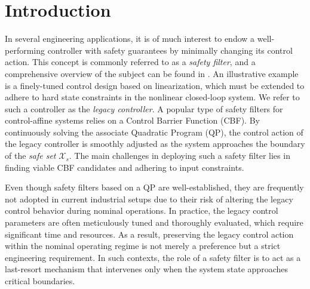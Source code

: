 \documentclass[lettersize,journal]{IEEEtran}
\newcommand{\afterReviewChangedBox}[1]{{\color{orange}#1}}
\begin{document}






\section{Introduction}

In several engineering applications, it is of much interest to endow a well-performing controller with safety guarantees by minimally changing its control action.
This concept is commonly referred to as a \textit{safety filter}, and a comprehensive overview of the subject can be found in \cite{wabersich2023data}.
An illustrative example is a finely-tuned control design based on linearization, which must be extended to adhere to hard state constraints in the nonlinear closed-loop system.
We refer to such a controller as the \emph{legacy controller}.
A popular type of safety filters \afterReviewChangedBox{for control-affine systems} relies on a Control Barrier Function (CBF).
By continuously solving the associate Quadratic Program (QP), the control action of the legacy controller is smoothly adjusted as the system approaches the boundary of the \emph{safe set} $\mathcal X_s$.
The main challenges in deploying such a safety filter lies in finding viable CBF candidates and adhering to input constraints.

Even though safety filters based on a QP are well-established, they are frequently not adopted in current industrial setups due to their risk of altering the legacy control behavior during nominal operations.
In practice, the legacy control parameters are often meticulously tuned and thoroughly evaluated, which require significant time and resources.
\afterReviewChangedBox{As a result, preserving the legacy control action within the nominal operating regime is not merely a preference but a strict engineering requirement.
In such contexts, the role of a safety filter is to act as a last-resort mechanism that intervenes only when the system state approaches critical boundaries.}
\end{document}
